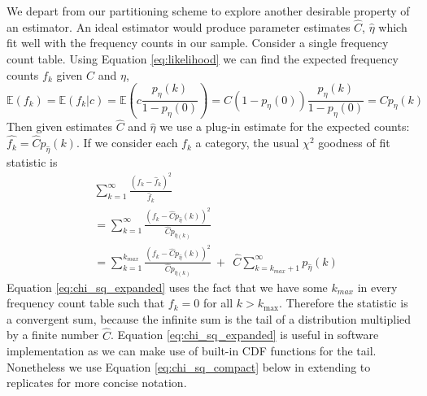 \documentclass[oupdraft]{bio}
\newcommand{\kmax}{k_{\text{max}}}
\begin{document}
We depart from our partitioning scheme to explore another desirable property of an estimator.  An ideal estimator would produce parameter estimates $\widehat{C}$, $\widehat{\eta}$ which fit well with the frequency counts in our sample.  Consider a single frequency count table.  Using Equation \ref{eq:likelihood} we can find the expected frequency counts $f_k$ given $C$ and $\eta$,
\begin{equation}
 \mathbb{E}\left(f_k\right) = \mathbb{E}\left(f_k|c \right) = \mathbb{E}\left( c \frac{p_{\eta}(k)}{1-p_{\eta}(0)} \right) = C\left(1-p_{\eta}(0) \right) \frac{p_{\eta}(k)}{1-p_{\eta}(0)} = Cp_{\eta}(k)
\end{equation}
Then given estimates $\widehat{C}$ and $\widehat{\eta}$ we use a plug-in estimate for the expected counts: $\widehat{f_k} = \widehat{C}p_{\widehat{\eta}}(k)$.  If we consider each $f_k$ a category, the usual $\chi^2$ goodness of fit statistic is
\begin{align}
&\sum_{k=1}^{\infty} \frac{\left(f_k - \widehat{f}_k \right)^2 }{\widehat{f}_k} \\
&=\sum_{k=1}^{\infty} \frac{\left(f_k - \widehat{C}p_{\widehat{\eta}}(k) \right)^2 }{\widehat{C} p_{\widehat{\eta}(k)}}  \label{eq:chi_sq_compact} \\
& = \sum_{k=1}^{k_{max}} \frac{\left(f_k - \widehat{C}p_{\widehat{\eta}}(k) \right)^2 }{\widehat{C} p_{\widehat{\eta}(k)}} \ + \ \ \widehat{C} \sum_{k = k_{max}+1}^{\infty} p_{\widehat{\eta}}(k) \label{eq:chi_sq_expanded}
\end{align}
Equation \ref{eq:chi_sq_expanded} uses the fact that we have some $k_{max}$ in every frequency count table such that $f_k = 0$ for all $k > \kmax$.  Therefore the statistic is a convergent sum, because the infinite sum is the tail of a distribution multiplied by a finite number $\widehat{C}$.  Equation \ref{eq:chi_sq_expanded} is useful in software implementation as we can make use of built-in CDF functions for the tail.  Nonetheless we use Equation \ref{eq:chi_sq_compact} below in extending to replicates for more concise notation.
\end{document}
